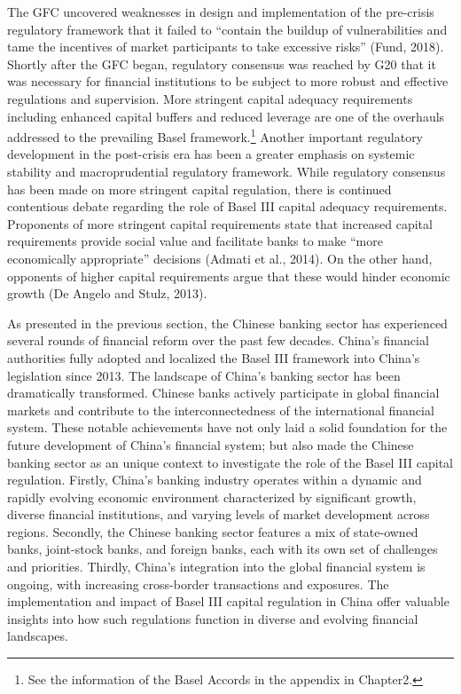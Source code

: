 \documentclass[
  12pt,
  a4paper,
  DIV=11,
  numbers=noendperiod]{scrreprt}
\begin{document}
The GFC uncovered weaknesses in design and implementation of the
pre-crisis regulatory framework that it failed to ``contain the buildup
of vulnerabilities and tame the incentives of market participants to
take excessive risks'' (Fund, 2018). Shortly after the GFC began,
regulatory consensus was reached by G20 that it was necessary for
financial institutions to be subject to more robust and effective
regulations and supervision. More stringent capital adequacy
requirements including enhanced capital buffers and reduced leverage are
one of the overhauls addressed to the prevailing Basel
framework.\footnote{See the information of the Basel Accords in the
  appendix in Chapter2.} Another important regulatory development in the
post-crisis era has been a greater emphasis on systemic stability and
macroprudential regulatory framework. While regulatory consensus has
been made on more stringent capital regulation, there is continued
contentious debate regarding the role of Basel III capital adequacy
requirements. Proponents of more stringent capital requirements state
that increased capital requirements provide social value and facilitate
banks to make ``more economically appropriate'' decisions (Admati et
al., 2014). On the other hand, opponents of higher capital requirements
argue that these would hinder economic growth (De Angelo and Stulz,
2013).

As presented in the previous section, the Chinese banking sector has
experienced several rounds of financial reform over the past few
decades. China's financial authorities fully adopted and localized the
Basel III framework into China's legislation since 2013. The landscape
of China's banking sector has been dramatically transformed. Chinese
banks actively participate in global financial markets and contribute to
the interconnectedness of the international financial system. These
notable achievements have not only laid a solid foundation for the
future development of China's financial system; but also made the
Chinese banking sector as an unique context to investigate the role of
the Basel III capital regulation. Firstly, China's banking industry
operates within a dynamic and rapidly evolving economic environment
characterized by significant growth, diverse financial institutions, and
varying levels of market development across regions. Secondly, the
Chinese banking sector features a mix of state-owned banks, joint-stock
banks, and foreign banks, each with its own set of challenges and
priorities. Thirdly, China's integration into the global financial
system is ongoing, with increasing cross-border transactions and
exposures. The implementation and impact of Basel III capital regulation
in China offer valuable insights into how such regulations function in
diverse and evolving financial landscapes.
\end{document}
